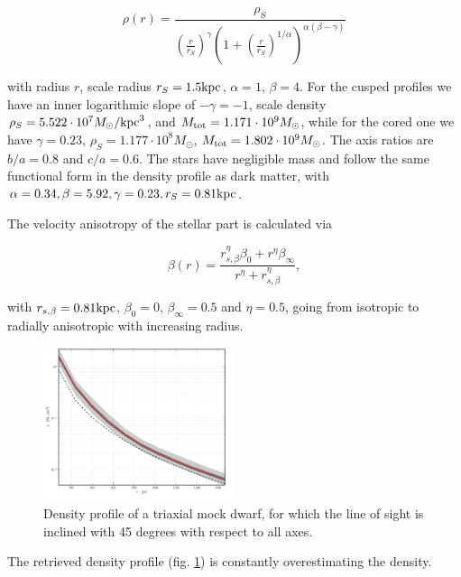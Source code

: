 \begin{equation}
\rho(r)=\frac{\rho_S}{\left(\frac{r}{r_S}\right)^\gamma\left(1+\left(\frac{r}{r_S}\right)^{1/\alpha}\right)^{\alpha(\beta-\gamma)}}
\end{equation}

with radius $r$, scale radius $r_S=1.5\mathrm{kpc}$, $\alpha=1$,
$\beta=4$. For the cusped profiles we have an inner logarithmic slope
of $-\gamma=-1$, scale density $\rho_S=5.522\cdot 10^7M_\odot/\mathrm{kpc}^3$,
and $M_{\mathrm{tot}}=1.171\cdot10^9M_\odot$, while for the cored one we have
$\gamma=0.23$, $\rho_S=1.177\cdot10^8M_\odot$,
$M_{\mathrm{tot}}=1.802\cdot10^9M_\odot$. The axis ratios are $b/a=0.8$ and
$c/a=0.6$. The stars have negligible mass and follow the same
functional form in the density profile as dark matter, with
$\alpha=0.34, \beta=5.92, \gamma=0.23, r_S=0.81\mathrm{kpc}$.

The velocity anisotropy of the stellar part is calculated via

\begin{equation}
\beta(r)=\frac{r_{s,\beta}^\eta \beta_0+r^\eta \beta_\infty}{r^\eta+r_{s,\beta}^\eta},
\end{equation}

with $r_{s,\beta}=0.81\mathrm{kpc}$, $\beta_0=0$, $\beta_\infty=0.5$ and
$\eta=0.5$, going from isotropic to radially anisotropic with
increasing radius.

\begin{figure}
\begin{center}
\hspace{-7mm}
\includegraphics[width=0.5\textwidth]{fig/20130718123300_cprior_nulog_denslog_mslope_rprior_profdens.pdf}
\caption{Density profile of a triaxial mock dwarf, for which the line
  of sight is inclined with 45 degrees with respect to all axes.}
\label{fig:triax}
\end{center}
\end{figure}

The retrieved density profile (fig. \ref{fig:triax}) is constantly
overestimating the density.


